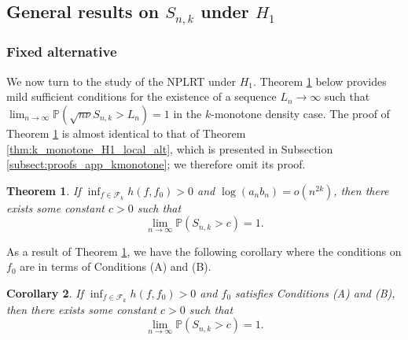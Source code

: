 \documentclass[12pt,letterpaper, twoside, openany]{article}
\theoremstyle{plain}
\newtheorem{theorem}{Theorem}[section]
\newtheorem{corollary}[theorem]{Corollary}
\begin{document}
\subsection{General results on $S_{n,k}$ under $H_1$}



\subsubsection{Fixed alternative}
We now turn to the study of the NPLRT under $H_1$. Theorem \ref{thm:k_monotone_H1} below provides mild sufficient conditions for the existence of a sequence $L_n \to \infty$ such that $\lim_{n \to \infty} \mathbb{P}(\sqrt{n\nu} S_{n,k} > L_n) = 1$ in the $k$-monotone density case. The proof of Theorem \ref{thm:k_monotone_H1} is almost identical to that of Theorem \ref{thm:k_monotone_H1_local_alt}, which is presented in Subsection \ref{subsect:proofs_app_kmonotone}; we therefore omit its proof.
\begin{theorem}\label{thm:k_monotone_H1}
		If $\inf_{f \in \mathcal{F}_k}h(f, f_0) > 0$ and $\log(a_n b_n) = o(n^{2k})$, then there exists some constant $c> 0$ such that
		\begin{equation*}
			\lim_{n\rightarrow \infty} \mathbb{P} ( S_{n,k} > c )  = 1. 
		\end{equation*}	
	\end{theorem}


As a result of Theorem \ref{thm:k_monotone_H1}, we have the following corollary where the conditions on $f_0$ are in terms of Conditions (A) and (B).
\begin{corollary}\label{thm:simple_k_monotone_H1}
    If $\inf_{f \in \mathcal{F}_k}h(f, f_0) > 0$ and $f_0$ satisfies Conditions (A) and (B), then there exists some constant $c> 0$ such that
    \begin{equation*}
        \lim_{n\rightarrow \infty} \mathbb{P} ( S_{n,k} > c )  = 1. 
    \end{equation*}	
\end{corollary}
\end{document}
